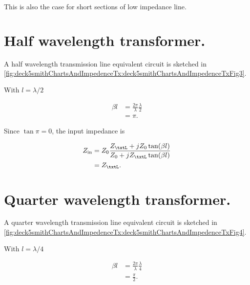 This is also the case for short sections of low impedance line.

\section{Half wavelength transformer.}

A half wavelength transmission line equivalent circuit is sketched in \cref{fig:deck5smithChartsAndImpedenceTx:deck5smithChartsAndImpedenceTxFig3}.


With \( l = \lambda/2 \)

\begin{equation}\label{eqn:uwavesDeck5SmithChartCore:180}
\begin{aligned}
\beta l
&= \frac{2 \pi}{\lambda} \frac{\lambda}{2}
\\ &= \pi.
\end{aligned}
\end{equation}

Since \( \tan \pi = 0 \), the input impedance is

\begin{equation}\label{eqn:uwavesDeck5SmithChartCore:200}
\begin{aligned}
Z_{\textrm{in}}
&= Z_0 \frac{ Z_\txtL + j Z_0 \tan(\beta l) }{ Z_0 + j Z_\txtL \tan(\beta l)}
\\ &= Z_\txtL.
\end{aligned}
\end{equation}

\section{Quarter wavelength transformer.}

A quarter wavelength transmission line equivalent circuit is sketched in \cref{fig:deck5smithChartsAndImpedenceTx:deck5smithChartsAndImpedenceTxFig4}.


With \( l = \lambda/4 \)

\begin{equation}\label{eqn:uwavesDeck5SmithChartCore:220}
\begin{aligned}
\beta l
&= \frac{2 \pi}{\lambda} \frac{\lambda}{4}
\\ &= \frac{\pi}{2}.
\end{aligned}
\end{equation}

